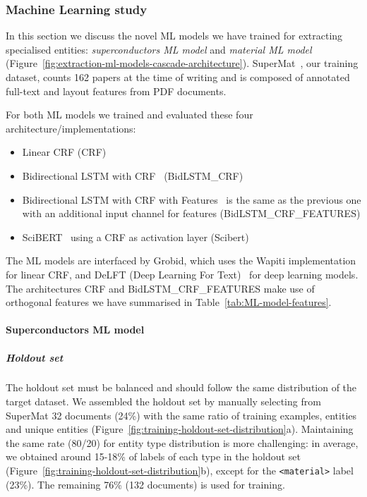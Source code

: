 \documentclass[]{interact}
\theoremstyle{plain}%
\theoremstyle{definition}
\theoremstyle{remark}
\begin{document}
\subsubsection*{Machine Learning study}

In this section we discuss the novel ML models we have trained for extracting specialised entities: \textit{superconductors ML model} and \textit{material ML model} (Figure~\ref{fig:extraction-ml-models-cascade-architecture}).
SuperMat~\cite{foppiano2021supermat}, our training dataset, counts 162 papers at the time of writing and is composed of annotated full-text and layout features from PDF documents.

For both ML models we trained and evaluated these four architecture/implementations:
\begin{itemize}
    \item Linear CRF (CRF)
    \item Bidirectional LSTM with CRF~\cite{Lample2016NeuralAF} (BidLSTM\_CRF)
    \item Bidirectional LSTM with CRF with Features~\cite{Lample2016NeuralAF} is the same as the previous one with an additional input channel for features (BidLSTM\_CRF\_FEATURES)
    \item SciBERT~\cite{Beltagy2019SciBERT} using a CRF as activation layer (Scibert)
\end{itemize}

The ML models are interfaced by Grobid, which uses the Wapiti\cite{lavergne2010practical} implementation for linear CRF, and DeLFT (Deep Learning For Text)~\cite{DeLFT} for deep learning models.
The architectures CRF and BidLSTM\_CRF\_FEATURES make use of orthogonal features we have summarised in Table~\ref{tab:ML-model-features}.

\paragraph*{Superconductors ML model}

\subparagraph*{Holdout set}
The holdout set must be balanced and should follow the same distribution of the target dataset.
We assembled the holdout set by manually selecting from SuperMat 32 documents (24\%) with the same ratio of training examples, entities and unique entities (Figure~\ref{fig:training-holdout-set-distribution}a).
Maintaining the same rate (80/20) for entity type distribution is more challenging: in average, we obtained around 15-18\% of labels of each type in the holdout set (Figure~\ref{fig:training-holdout-set-distribution}b), except for the \texttt{<material>} label (23\%). %
The remaining 76\% (132 documents) is used for training.
\end{document}
